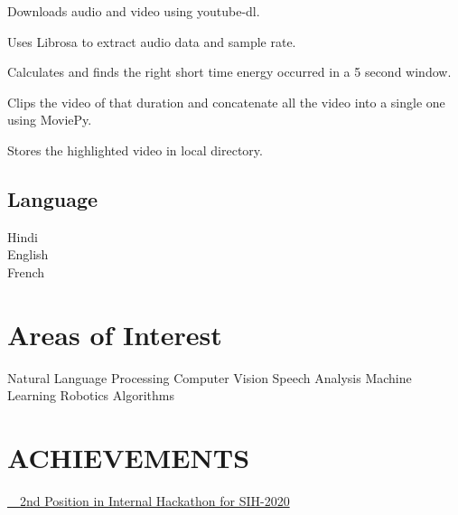 \documentclass[]{deedy-resume-openfont}
\begin{document}
\begin{minipage}[t]{0.66\textwidth}
\begin{tightemize}
\item Downloads audio and video using youtube-dl.
\item Uses Librosa to extract audio data and sample rate. \\
\item Calculates and finds the right short time energy occurred in a 5 second window. \\
\item Clips the video of that duration and concatenate all the video into a single one using MoviePy. \\
\item Stores the highlighted video in local directory.
\end{tightemize}
\sectionsep



\end{minipage}
\newpage
\begin{minipage}[t]{0.33\textwidth}

\subsection{Language}
 Hindi\\
 English\\
 French\\

\section{Areas of Interest}
 Natural Language Processing \textbullet{} Computer Vision \textbullet{} Speech Analysis \textbullet{} Machine Learning \textbullet{} Robotics \textbullet{} Algorithms

\section{ACHIEVEMENTS} 
    \item {\href{https://drive.google.com/file/d/1YIRLa9Qt6k5Ax9tsddHiwMv6BL78XteQ/view?usp=sharing}{{\faTrophy\ \ 2nd Position in Internal Hackathon for SIH-2020}}}
\sectionsep
\end{minipage}
\hfill
\end{document}
